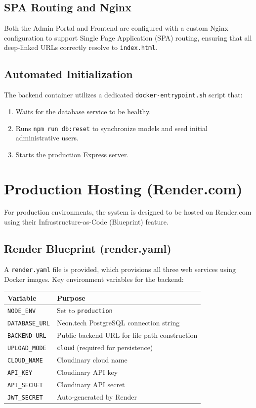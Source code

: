 \documentclass[12pt,a4paper]{article}
\begin{document}
\subsection{SPA Routing and Nginx}

Both the Admin Portal and Frontend are configured with a custom Nginx configuration to support Single Page Application (SPA) routing, ensuring that all deep-linked URLs correctly resolve to \texttt{index.html}.

\subsection{Automated Initialization}
The backend container utilizes a dedicated \texttt{docker-entrypoint.sh} script that:
\begin{enumerate}
    \item Waits for the database service to be healthy.
    \item Runs \texttt{npm run db:reset} to synchronize models and seed initial administrative users.
    \item Starts the production Express server.
\end{enumerate}

\section{Production Hosting (Render.com)}

For production environments, the system is designed to be hosted on Render.com using their Infrastructure-as-Code (Blueprint) feature.

\subsection{Render Blueprint (render.yaml)}
A \texttt{render.yaml} file is provided, which provisions all three web services using Docker images.
Key environment variables for the backend:

\begin{center}
\begin{tabular}{ll}
\toprule
Variable & Purpose \\
\midrule
\texttt{NODE\_ENV} & Set to \texttt{production} \\
\texttt{DATABASE\_URL} & Neon.tech PostgreSQL connection string \\
\texttt{BACKEND\_URL} & Public backend URL for file path construction \\
\texttt{UPLOAD\_MODE} & \texttt{cloud} (required for persistence) \\
\texttt{CLOUD\_NAME} & Cloudinary cloud name \\
\texttt{API\_KEY} & Cloudinary API key \\
\texttt{API\_SECRET} & Cloudinary API secret \\
\texttt{JWT\_SECRET} & Auto-generated by Render \\
\bottomrule
\end{tabular}
\end{center}
\end{document}
